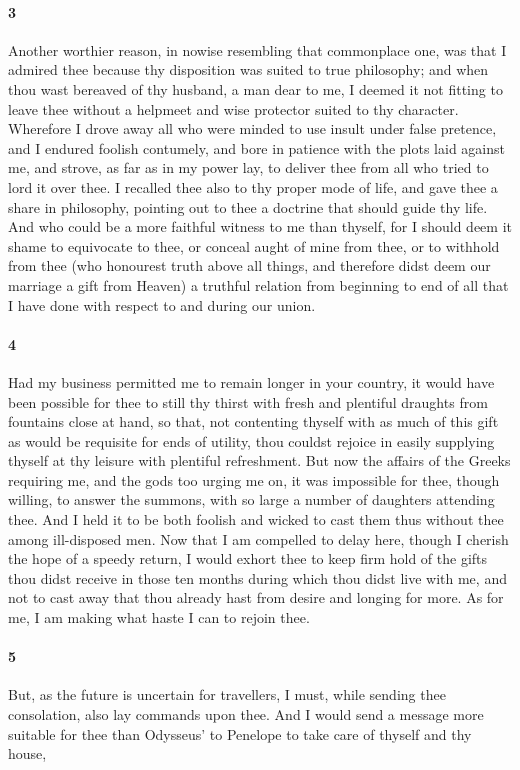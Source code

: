 \documentclass[12pt]{article}
\begin{document}
\paragraph{3} Another worthier reason, in nowise resembling that commonplace one, was that I admired thee because thy disposition was suited to true philosophy; and when thou wast bereaved of thy husband, a man dear to me, I deemed it not fitting to leave thee without a helpmeet and wise protector suited to thy character. Wherefore I drove away all who were minded to use insult under false pretence, and I endured foolish contumely, and bore in patience with the plots laid against me, and strove, as far as in my power lay, to deliver thee from all who tried to lord it over thee. I recalled thee also to thy proper mode of life, and gave thee a share in philosophy, pointing out to thee a doctrine that should guide thy life. And who could be a more faithful witness to me than thyself, for I should deem it shame to equivocate to thee, or conceal aught of mine from thee, or to withhold from thee (who honourest truth above all things, and therefore didst deem our marriage a gift from Heaven) a truthful relation from beginning to end of all that I have done with respect to and during our union.

\paragraph{4} Had my business permitted me to remain longer in your country, it would have been possible for thee to still thy thirst with fresh and plentiful draughts from fountains close at hand, so that, not contenting thyself with as much of this gift as would be requisite for ends of utility, thou couldst rejoice in easily supplying thyself at thy leisure with plentiful refreshment. But now the affairs of the Greeks requiring me, and the gods too urging me on, it was impossible for thee, though willing, to answer the summons, with so large a number of daughters attending thee. And I held it to be both foolish and wicked to cast them thus without thee among ill-disposed men. Now that I am compelled to delay here, though I cherish the hope of a speedy return, I would exhort thee to keep firm hold of the gifts thou didst receive in those ten months during which thou didst live with me, and not to cast away that thou already hast from desire and longing for more. As for me, I am making what haste I can to rejoin thee.

\paragraph{5} But, as the future is uncertain for travellers, I must, while sending thee consolation, also lay commands upon thee. And I would send a message more suitable for thee than Odysseus' to Penelope to take care of thyself and thy house,
\end{document}
